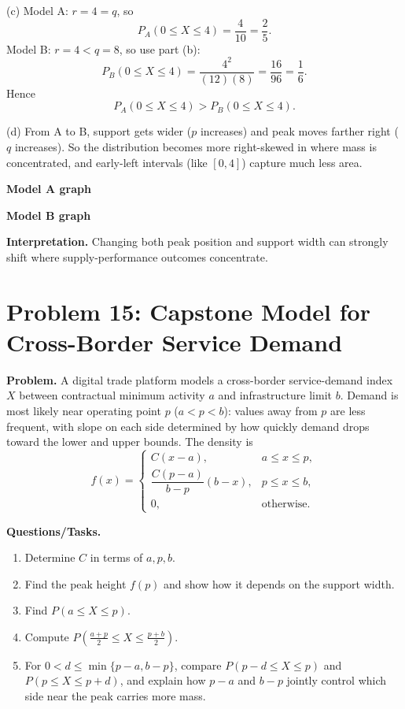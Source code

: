 (c) Model A: $r=4=q$, so
\[
P_A(0\le X\le 4)=\frac{4}{10}=\frac25.
\]
Model B: $r=4<q=8$, so use part (b):
\[
P_B(0\le X\le 4)=\frac{4^2}{(12)(8)}=\frac{16}{96}=\frac16.
\]
Hence
\[
P_A(0\le X\le 4)>P_B(0\le X\le 4).
\]

(d) From A to B, support gets wider ($p$ increases) and peak moves farther right ($q$ increases). So the distribution becomes more right-skewed in where mass is concentrated, and early-left intervals (like $[0,4]$) capture much less area.

\textbf{Model A graph}

\textbf{Model B graph}

\textbf{Interpretation.}
Changing both peak position and support width can strongly shift where supply-performance outcomes concentrate.

\section{Problem 15: Capstone Model for Cross-Border Service Demand}

\textbf{Problem.}
A digital trade platform models a cross-border service-demand index $X$ between contractual minimum activity $a$ and infrastructure limit $b$. Demand is most likely near operating point $p$ ($a<p<b$): values away from $p$ are less frequent, with slope on each side determined by how quickly demand drops toward the lower and upper bounds. The density is
\[
f(x)=\begin{cases}
C(x-a), & a\le x\le p,\\
\dfrac{C(p-a)}{b-p}(b-x), & p\le x\le b,\\
0, & \text{otherwise.}
\end{cases}
\]

\textbf{Questions/Tasks.}
\begin{enumerate}[label=(\alph*)]
\item Determine $C$ in terms of $a,p,b$.
\item Find the peak height $f(p)$ and show how it depends on the support width.
\item Find $P(a\le X\le p)$.
\item Compute $P\!\left(\frac{a+p}{2}\le X\le\frac{p+b}{2}\right)$.
\item For $0<d\le\min\{p-a,b-p\}$, compare $P(p-d\le X\le p)$ and $P(p\le X\le p+d)$, and explain how $p-a$ and $b-p$ jointly control which side near the peak carries more mass.
\end{enumerate}

